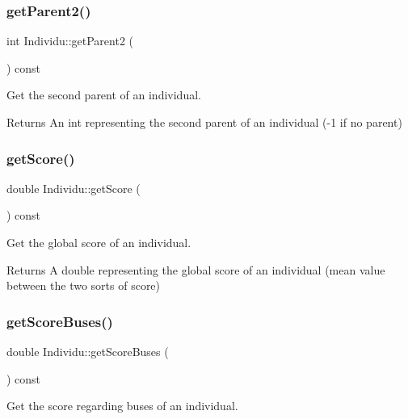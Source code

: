 \subsubsection{\texorpdfstring{get\+Parent2()}{getParent2()}}
{\footnotesize\ttfamily int Individu\+::get\+Parent2 (\begin{DoxyParamCaption}{ }\end{DoxyParamCaption}) const}



Get the second parent of an individual. 

\begin{DoxyReturn}{Returns}
An int representing the second parent of an individual (-\/1 if no parent) 
\end{DoxyReturn}
\mbox{\label{class_individu_acbbbfb9528094739f13041dbbe82c989}} 
\subsubsection{\texorpdfstring{get\+Score()}{getScore()}}
{\footnotesize\ttfamily double Individu\+::get\+Score (\begin{DoxyParamCaption}{ }\end{DoxyParamCaption}) const}



Get the global score of an individual. 

\begin{DoxyReturn}{Returns}
A double representing the global score of an individual (mean value between the two sorts of score) 
\end{DoxyReturn}
\mbox{\label{class_individu_a2ff6f8c293a8794bce32391f5ed3c470}} 
\subsubsection{\texorpdfstring{get\+Score\+Buses()}{getScoreBuses()}}
{\footnotesize\ttfamily double Individu\+::get\+Score\+Buses (\begin{DoxyParamCaption}{ }\end{DoxyParamCaption}) const}



Get the score regarding buses of an individual. 

